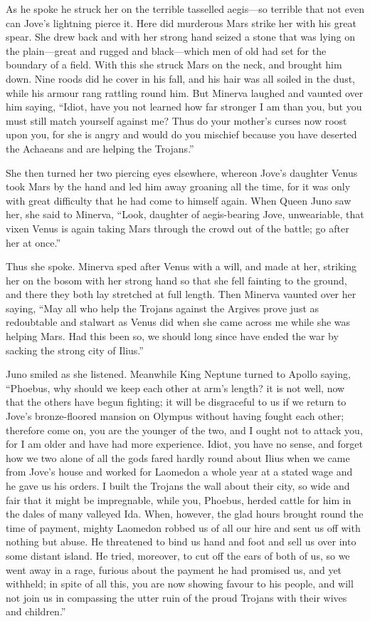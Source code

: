 As he spoke he struck her on the terrible tasselled aegis—so
terrible that not even can Jove’s lightning pierce it. Here did murderous
Mars strike her with his great spear. She drew back and with her strong
hand seized a stone that was lying on the plain—great and rugged and
black—which men of old had set for the boundary of a field. With
this she struck Mars on the neck, and brought him down. Nine roods did he
cover in his fall, and his hair was all soiled in the dust, while his
armour rang rattling round him. But Minerva laughed and vaunted over him
saying, “Idiot, have you not learned how far stronger I am than you, but
you must still match yourself against me? Thus do your mother’s curses now
roost upon you, for she is angry and would do you mischief because you
have deserted the Achaeans and are helping the Trojans.”

She then turned her two piercing eyes elsewhere, whereon Jove’s daughter
Venus took Mars by the hand and led him away groaning all the time, for it
was only with great difficulty that he had come to himself again. When
Queen Juno saw her, she said to Minerva, “Look, daughter of aegis-bearing
Jove, unweariable, that vixen Venus is again taking Mars through the crowd
out of the battle; go after her at once.”

Thus she spoke. Minerva sped after Venus with a will, and made at her,
striking her on the bosom with her strong hand so that she fell fainting
to the ground, and there they both lay stretched at full length. Then
Minerva vaunted over her saying, “May all who help the Trojans against the
Argives prove just as redoubtable and stalwart as Venus did when she came
across me while she was helping Mars. Had this been so, we should long
since have ended the war by sacking the strong city of Ilius.”

Juno smiled as she listened. Meanwhile King Neptune turned to Apollo
saying, “Phoebus, why should we keep each other at arm’s length? it is not
well, now that the others have begun fighting; it will be disgraceful to
us if we return to Jove’s bronze-floored mansion on Olympus without having
fought each other; therefore come on, you are the younger of the two, and
I ought not to attack you, for I am older and have had more experience.
Idiot, you have no sense, and forget how we two alone of all the gods
fared hardly round about Ilius when we came from Jove’s house and worked
for Laomedon a whole year at a stated wage and he gave us his orders. I
built the Trojans the wall about their city, so wide and fair that it
might be impregnable, while you, Phoebus, herded cattle for him in the
dales of many valleyed Ida. When, however, the glad hours brought round
the time of payment, mighty Laomedon robbed us of all our hire and sent us
off with nothing but abuse. He threatened to bind us hand and foot and
sell us over into some distant island. He tried, moreover, to cut off the
ears of both of us, so we went away in a rage, furious about the payment
he had promised us, and yet withheld; in spite of all this, you are now
showing favour to his people, and will not join us in compassing the utter
ruin of the proud Trojans with their wives and children.”

